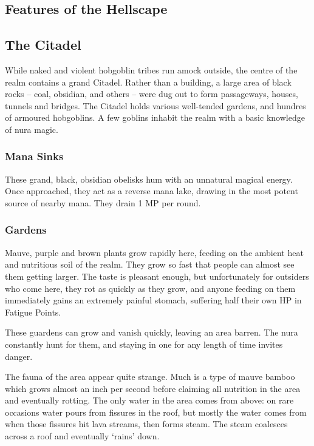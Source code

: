 \begin{multicols}{2}
\subsection{Features of the Hellscape}

\subsection{The Citadel}

While naked and violent hobgoblin tribes run amock outside, the centre of the realm contains a grand Citadel.
Rather than a building, a large area of black rocks  -- coal, obsidian, and others -- were dug out to form passageways, houses, tunnels and bridges.
The Citadel holds various well-tended gardens, and hundres of armoured hobgoblins.
A few goblins inhabit the realm with a basic knowledge of nura magic.

\subsubsection{Mana Sinks}

These grand, black, obsidian obelisks hum with an unnatural magical energy.
Once approached, they act as a reverse mana lake, drawing in the most potent source of nearby mana.
They drain 1 MP per round.

\subsubsection{Gardens}

Mauve, purple and brown plants grow rapidly here, feeding on the ambient heat and nutritious soil of the realm.  They grow so fast that people can almost see them getting larger.  The taste is pleasant enough, but unfortunately for outsiders who come here, they rot as quickly as they grow, and anyone feeding on them immediately gains an extremely painful stomach, suffering half their own HP in Fatigue Points.

These guardens can grow and vanish quickly, leaving an area barren.  The nura constantly hunt for them, and staying in one for any length of time invites danger.

The fauna of the area appear quite strange. Much is a type of mauve bamboo which grows almost an inch per second before claiming all nutrition in the area and eventually rotting.  The only water in the area comes from above: on rare occasions water pours from fissures in the roof, but mostly the water comes from when those fissures hit lava streams, then forms steam.  The steam coalesces across a roof and eventually `rains' down.


\end{multicols}
